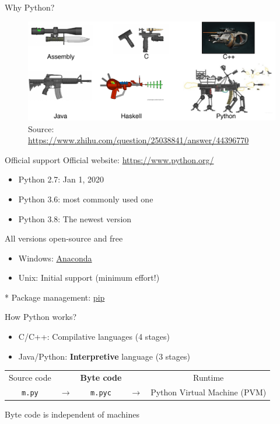 \documentclass{../TexTemplate/myslide}
\begin{document}
\begin{frame}{Why Python?}
\begin{figure}
\centering
\includegraphics[width=\linewidth]{fig/python-comparison.pdf}
\caption*{\scriptsize Source: \url{https://www.zhihu.com/question/25038841/answer/44396770}}
\end{figure}
\end{frame}

\begin{frame}{Official support}
Official website: \url{https://www.python.org/}
\begin{itemize}
\item Python 2.7: \xmark Jan 1, 2020
\item Python 3.6: \cmark most commonly used one
\item Python 3.8: The newest version
\end{itemize}
All versions open-source and free
\begin{itemize}
	\item Windows: \href{https://www.anaconda.com/}{Anaconda}
	\item Unix: Initial support (minimum effort!)
\end{itemize}
* Package management: \href{https://pypi.org/project/pip/}{pip}
\end{frame}

\begin{frame}[fragile]{How Python works?}
\begin{itemize}
	\item C/C++: Compilative languages (4 stages)
	\item Java/Python: \textbf{Interpretive} language (3 stages)
\end{itemize}
\pause
\begin{center}
\begin{tabular}{ccccc}
Source code &  & \textbf{Byte code} & & Runtime\\
\verb'm.py' & $\to$ & \verb'm.pyc' & $\to$ & Python Virtual Machine (PVM)
\end{tabular}
\end{center}
Byte code is independent of machines
\end{frame}
\end{document}
